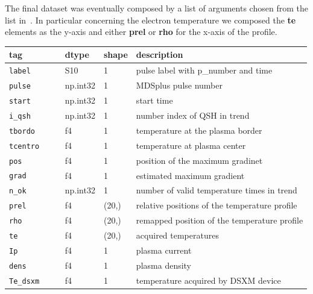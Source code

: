 The final dataset was eventually composed by a list of arguments chosen from the list in~\Table{\ref{tab:database}}.
In particular concerning the electron temperature we composed the \textbf{te} elements as the y-axis and either \textbf{prel} or \textbf{rho} for the x-axis of the profile. 
\begin{table}[]
    \centering
    \begin{tabular}{l|l|l|l}
\textbf{tag} & \textbf{dtype} & \textbf{shape} & \textbf{description} \\
\hline
\verb|label      | & S10        & 1         &   pulse label with p\_number and time                 \\
\verb|pulse      | & np.int32   & 1         &   MDSplus pulse number                                \\
\verb|start      | & np.int32   & 1         &   start time                       \\
\verb|i_qsh      | & np.int32   & 1         &   number index of QSH in trend                        \\
\verb|tbordo     | & f4         & 1         &   temperature at the plasma border                    \\
\verb|tcentro    | & f4         & 1         &   temperature at plasma center                        \\
\verb|pos        | & f4         & 1         &   position of the maximum gradinet                    \\
\verb|grad       | & f4         & 1         &   estimated maximum gradient                          \\
\verb|n_ok       | & np.int32   & 1         &   number of valid temperature times in trend          \\
\verb|prel       | & f4         & (20,)     &   relative positions of the temperature profile       \\
\verb|rho        | & f4         & (20,)     &   remapped position of the temperature profile        \\
\verb|te         | & f4         & (20,)     &   acquired temperatures                               \\
\verb|Ip         | & f4         & 1         &   plasma current                                      \\
\verb|dens       | & f4         & 1         &   plasma density                                      \\
\verb|Te_dsxm    | & f4         & 1         &   temperature acquired by DSXM device                 \\

\end{tabular}
\end{table}
